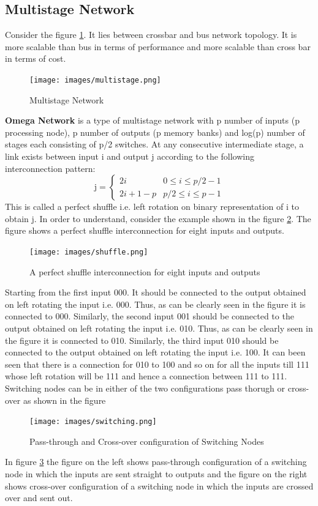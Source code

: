 \documentclass[12pt]{book}
\begin{document}
\subsection{Multistage Network}
Consider the figure \ref{fig:multistage}. It lies between crossbar and bus network topology.
It is more scalable than bus in terms of performance and more scalable than cross bar in terms of cost.
\begin{figure}[H]
    \centering
    \texttt{[image: images/multistage.png]}
    \caption{Multistage Network}
    \label{fig:multistage}
\end{figure}
\textbf{Omega Network} is a type of multistage network with p number of inputs (p processing node), 
p number of outputs (p memory banks) and log(p) number of stages each consisting of p/2 switches. At any consecutive intermediate stage, 
a link exists between input i and output j according to the following interconnection pattern:
\begin{equation}
    \text{j} = 
    \begin{cases}
        2i & 0\leq i\leq p/2-1 \\
        2i+1-p & p/2\leq i\leq p-1
    \end{cases}
\end{equation}
This is called a perfect shuffle i.e. left rotation on binary representation of i to obtain j.
In order to understand, consider the example shown in the figure \ref{fig:shuffle}. The figure shows a perfect shuffle interconnection for eight inputs and outputs.
\begin{figure}[H]
    \centering
    \texttt{[image: images/shuffle.png]}
    \caption{A perfect shuffle interconnection for eight inputs and outputs}
    \label{fig:shuffle}
\end{figure}
Starting from the first input 000. It should be connected to the output obtained on left rotating the input i.e. 000. 
Thus, as can be clearly seen in the figure it is connected to 000. Similarly, the second input 001 should be connected to the output obtained on left rotating the input i.e. 010.
Thus, as can be clearly seen in the figure it is connected to 010. Similarly, the third input 010 should be connected to the output obtained on left rotating the input i.e. 100. 
It can been seen that there is a connection for 010 to 100 and so on for all the inputs till 111 whose left rotation will be 111 and hence a connection between 111 to 111.
Switching nodes can be in either of the two configurations pass thorugh or cross-over as shown in the figure 
\begin{figure}[H]
    \centering
    \texttt{[image: images/switching.png]}
    \caption{Pass-through and Cross-over configuration of Switching Nodes}
    \label{fig:switching}
\end{figure}
In figure \ref{fig:switching} the figure on the left shows pass-through configuration of a switching node in which the inputs are sent straight to outputs
and the figure on the right shows cross-over configuration of a switching node in which the inputs are crossed over and sent out.
\end{document}
